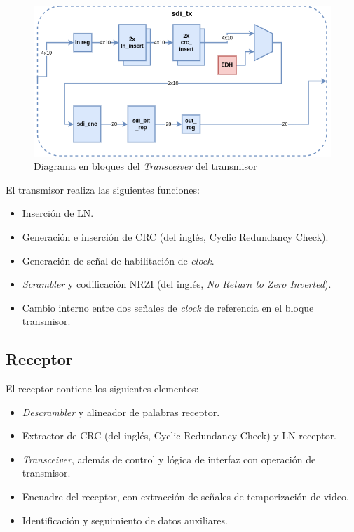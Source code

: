   \vspace{1cm}
  \begin{figure}[htbp]
      \centering
      \includegraphics[width=\linewidth]{./Figures/sdi_tx.png}
      \caption{Diagrama en bloques del \textit{Transceiver} del transmisor}\label{fig:sdi_tx}
  \end{figure}
  \vspace{1cm}

  El transmisor realiza las siguientes funciones:
  \begin{itemize}
      \item Inserción de LN\@.
      \item Generación e inserción de CRC  (del inglés, Cyclic Redundancy Check)\@.
      \item Generación de señal de habilitación de \textit{clock}.
      \item \textit{Scrambler} y codificación NRZI (del inglés, \textit{No Return to Zero Inverted}).
      \item Cambio interno entre dos señales de \textit{clock} de referencia en el bloque transmisor.
  \end{itemize}

\subsection{Receptor}

  El receptor contiene los siguientes elementos:
  \begin{itemize}
      \item \textit{Descrambler} y alineador de palabras receptor.
      \item Extractor de CRC  (del inglés, Cyclic Redundancy Check) y LN receptor.
      \item \textit{Transceiver}, además de control y lógica de interfaz con operación de transmisor.
      \item Encuadre del receptor, con extracción de señales de temporización de video.
      \item Identificación y seguimiento de datos auxiliares.
  \end{itemize}

